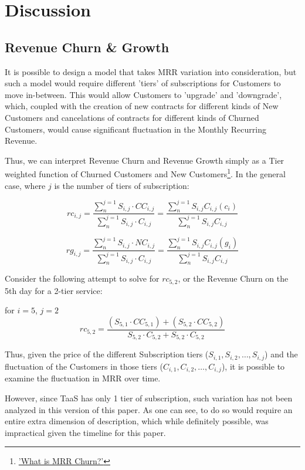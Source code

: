 \documentclass[11pt]{article}
\begin{document}
\newpage

\section*{Discussion}

\subsection*{Revenue Churn \& Growth}

It is possible to design a model that takes MRR variation into consideration, but such a model would require different 'tiers' of subscriptions for Customers to move in-between. This would allow Customers to 'upgrade' and 'downgrade', which, coupled with the creation of new contracts for different kinds of New Customers and cancelations of contracts for different kinds of Churned Customers, would cause significant fluctuation in the Monthly Recurring Revenue.  

Thus, we can interpret Revenue Churn and Revenue Growth simply as a Tier weighted function of Churned Customers and New Customers\footnote{\href{http://chaotic-flow.com/what-is-mrr-churn-saas-metrics-faqs-part-2/}{'What is MRR Churn?'}}. In the general case, where $j$ is the number of tiers of subscription:

\[
rc_{i,j} =  \frac{\sum_{n}^{j=1}S_{i,j} \cdot CC_{i,j}}{\sum_{n}^{j=1}S_{i,j} \cdot C_{i,j}} = \frac{\sum_{n}^{j=1}S_{i,j}C_{i,j}(c_{i})}{\sum_{n}^{j=1}S_{i,j}{C_{i,j}}}
\]

\[
rg_{i,j} =  \frac{\sum_{n}^{j=1}S_{i,j} \cdot NC_{i,j}}{\sum_{n}^{j=1}S_{i,j} \cdot C_{i,j}} = \frac{\sum_{n}^{j=1}S_{i,j}C_{i,j}(g_{i})}{\sum_{n}^{j=1}S_{i,j}{C_{i,j}}}
\]

Consider the following attempt to solve for $rc_{5,2}$, or the Revenue Churn on the 5th day for a 2-tier service:

for $i = 5$, $j = {2}$
 \[
 rc_{5,2} = \frac{(S_{5,1} \cdot CC_{5,1}) + (S_{5,2} \cdot CC_{5,2})}{S_{5,2} \cdot C_{5,2} + S_{5,2} \cdot C_{5,2}}
 \]

Thus, given the price of the different Subscription tiers ($S_{i,1}, S_{i,2}, \ldots, S_{i,j}$) and the fluctuation of the Customers in those tiers ($C_{i,1}, C_{i,2}, \ldots, C_{i,j}$), it is possible to examine the fluctuation in MRR over time. 

However, since TaaS has only 1 tier of subscription, such variation has not been analyzed in this version of this paper. As one can see, to do so would require an entire extra dimension of description, which while definitely possible, was impractical given the timeline for this paper.
\end{document}
